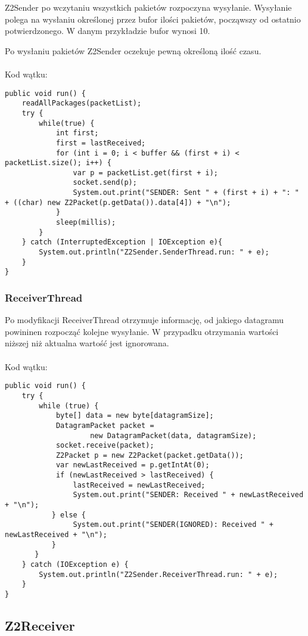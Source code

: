 \documentclass[12pt]{article}
\begin{document}
Z2Sender po wczytaniu wszystkich pakietów rozpoczyna wysyłanie. Wysyłanie polega na wysłaniu określonej przez bufor ilości pakietów, począwszy od ostatnio potwierdzonego. W danym przykładzie bufor wynosi 10.

Po wysłaniu pakietów Z2Sender oczekuje pewną określoną ilość czasu.
\\
\\
Kod wątku:
\begin{verbatim}
public void run() {
    readAllPackages(packetList);
    try {
        while(true) {
            int first;
            first = lastReceived;
            for (int i = 0; i < buffer && (first + i) < packetList.size(); i++) {
                var p = packetList.get(first + i);
                socket.send(p);
                System.out.print("SENDER: Sent " + (first + i) + ": " + ((char) new Z2Packet(p.getData()).data[4]) + "\n");
            }
            sleep(millis);
        }
    } catch (InterruptedException | IOException e){
        System.out.println("Z2Sender.SenderThread.run: " + e);
    }
}

\end{verbatim}
\subsubsection{ReceiverThread}
Po modyfikacji ReceiverThread otrzymuje informację, od jakiego datagramu powininen rozpocząć kolejne wysyłanie. W przypadku otrzymania wartości niższej niż aktualna wartość jest ignorowana.
\\
\\
Kod wątku:
\begin{verbatim}
public void run() {
    try {
        while (true) {
            byte[] data = new byte[datagramSize];
            DatagramPacket packet =
                    new DatagramPacket(data, datagramSize);
            socket.receive(packet);
            Z2Packet p = new Z2Packet(packet.getData());
            var newLastReceived = p.getIntAt(0);
            if (newLastReceived > lastReceived) {
                lastReceived = newLastReceived;
                System.out.print("SENDER: Received " + newLastReceived + "\n");
           } else {
                System.out.print("SENDER(IGNORED): Received " + newLastReceived + "\n");
           }
       }
    } catch (IOException e) {
        System.out.println("Z2Sender.ReceiverThread.run: " + e);
    }
}
\end{verbatim}

\pagebreak
\subsection{Z2Receiver}
\end{document}
